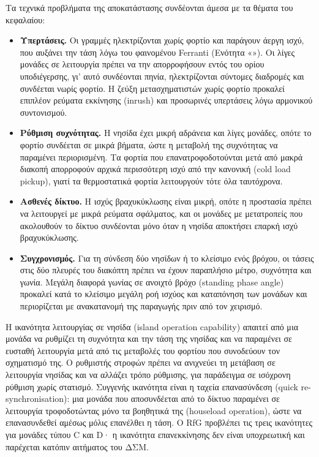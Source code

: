 Τα τεχνικά προβλήματα της αποκατάστασης συνδέονται άμεσα με τα θέματα του κεφαλαίου:

\begin{itemize}
\item \textbf{Υπερτάσεις.} Οι γραμμές ηλεκτρίζονται χωρίς φορτίο και παράγουν άεργη ισχύ, που
      αυξάνει την τάση λόγω του φαινομένου Ferranti (Ενότητα «»). Οι λίγες
      μονάδες σε λειτουργία πρέπει να την απορροφήσουν εντός του ορίου υποδιέγερσης, γι' αυτό
      συνδέονται πηνία, ηλεκτρίζονται σύντομες διαδρομές και συνδέεται νωρίς φορτίο. Η ζεύξη
      μετασχηματιστών χωρίς φορτίο προκαλεί επιπλέον ρεύματα εκκίνησης (inrush) και προσωρινές
      υπερτάσεις λόγω αρμονικού συντονισμού.
\item \textbf{Ρύθμιση συχνότητας.} Η νησίδα έχει μικρή αδράνεια και λίγες μονάδες, οπότε το
      φορτίο συνδέεται σε μικρά βήματα, ώστε η μεταβολή της συχνότητας να παραμένει
      περιορισμένη. Τα φορτία που επανατροφοδοτούνται μετά από μακρά διακοπή απορροφούν αρχικά
      περισσότερη ισχύ από την κανονική (cold load pickup), γιατί τα θερμοστατικά φορτία
      λειτουργούν τότε όλα ταυτόχρονα.
\item \textbf{Ασθενές δίκτυο.} Η ισχύς βραχυκύκλωσης είναι μικρή, οπότε η προστασία πρέπει να
      λειτουργεί με μικρά ρεύματα σφάλματος, και οι μονάδες με μετατροπείς που ακολουθούν το
      δίκτυο συνδέονται μόνο όταν η νησίδα αποκτήσει επαρκή ισχύ βραχυκύκλωσης.
\item \textbf{Συγχρονισμός.} Για τη σύνδεση δύο νησίδων ή το κλείσιμο ενός βρόχου, οι τάσεις
      στις δύο πλευρές του διακόπτη πρέπει να έχουν παραπλήσιο μέτρο, συχνότητα και γωνία.
      Μεγάλη διαφορά γωνίας σε ανοιχτό βρόχο (standing phase angle) προκαλεί κατά το κλείσιμο
      μεγάλη ροή ισχύος και καταπόνηση των μονάδων και περιορίζεται με ανακατανομή της παραγωγής
      πριν από τον χειρισμό.
\end{itemize}

Η ικανότητα λειτουργίας σε νησίδα (island operation capability) απαιτεί από μια μονάδα να
ρυθμίζει τη συχνότητα και την τάση της νησίδας και να παραμένει σε ευσταθή λειτουργία μετά από
τις μεταβολές του φορτίου που συνοδεύουν τον σχηματισμό της. Ο ρυθμιστής στροφών πρέπει να
ανιχνεύει τη μετάβαση σε λειτουργία νησίδας και να αλλάζει τρόπο ρύθμισης, για παράδειγμα σε
ισόχρονη ρύθμιση χωρίς στατισμό. Συγγενής ικανότητα είναι η ταχεία επανασύνδεση (quick
re-synchronisation): μια μονάδα που αποσυνδέεται από το δίκτυο παραμένει σε λειτουργία
τροφοδοτώντας μόνο τα βοηθητικά της (houseload operation), ώστε να επανασυνδεθεί αμέσως μόλις
επανέλθει η τάση. Ο RfG προβλέπει τις τρεις ικανότητες για μονάδες τύπου C και D· η ικανότητα
επανεκκίνησης δεν είναι υποχρεωτική και παρέχεται κατόπιν αιτήματος του ΔΣΜ.

